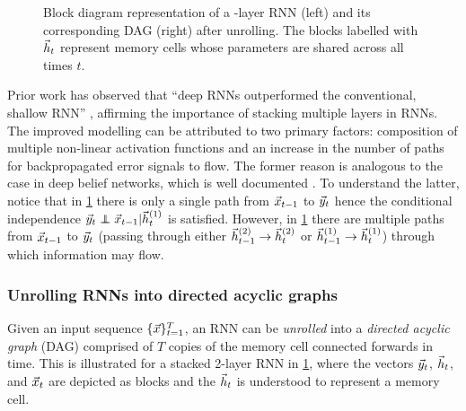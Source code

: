 \begin{figure}[tb]
    \centering
    \resizebox{4.5in}{!}{}
    \caption{Block diagram representation of a -layer RNN (left) and its
    corresponding DAG (right) after unrolling. The blocks labelled
    with $\vec{h}_t$ represent memory cells whose parameters are shared across all times
  $t$.}
    \label{fig:rnn-multi-unrolled}
\end{figure}

Prior work has observed that ``deep RNNs outperformed the conventional, shallow RNN''
\citet{pascanu2013construct}, affirming the importance of stacking multiple layers
in RNNs. The improved modelling   can be attributed to two primary
factors: composition of multiple non-linear activation functions and an
increase in the number of paths for backpropagated error signals to flow. The
former reason is analogous to the case in deep belief networks, which is well
documented \citep{bengio2009learning}. To understand the latter, notice that in
\cref{fig:rnn-multi-unrolled} there is only a single path from $\vec{x}_{t-1}$ to
$\vec{y}_{t}$ hence the conditional independence $\y_{t} \independent \x_{t-1} |
\h^{(1)}_t$ is satisfied. However, in \cref{fig:rnn-multi-unrolled} there are
multiple paths from $\vec{x}_{t-1}$ to $\vec{y}_{t}$ (\eg passing through either
$\vec{h}^{(2)}_{t-1} \to \vec{h}^{(2)}_t$ or $\vec{h}^{(1)}_{t-1} \to \vec{h}^{(1)}_t$) through
which information may flow.

\subsubsection{Unrolling RNNs into directed acyclic graphs}


Given an input sequence $\{\vec{x}\}_{t=1}^T$, an RNN can be \emph{unrolled} into a
\emph{directed acyclic graph} (DAG) comprised of $T$ copies of the memory cell
connected forwards in time. This is illustrated for a stacked 2-layer RNN in
\cref{fig:rnn-multi-unrolled}, where the vectors $\vec{y}_t$, $\vec{h}_t$, and $\vec{x}_t$ are
depicted as blocks and the $\vec{h}_t$ is understood to represent a memory cell.


